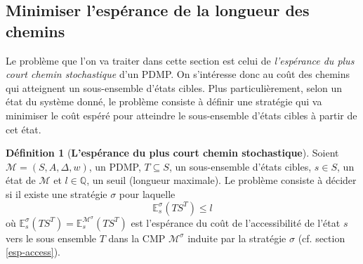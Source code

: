 \documentclass[12pt,a4paper]{report}
\theoremstyle{definition}%
\newtheorem{definition}{Définition}[chapter]
\theoremstyle{remark}
\begin{document}
\subsection{Minimiser l'espérance de la longueur des chemins}\label{sspe}
	Le problème que l'on va traiter dans cette section est celui de
	\textit{l'espérance du plus court chemin stochastique} d'un PDMP.
	On s'intéresse donc au coût des chemins qui atteignent un sous-ensemble
	d'états cibles.
	Plus particulièrement, selon un état du système donné, le problème consiste
	à définir une stratégie qui va minimiser le coût espéré pour atteindre le
	sous-ensemble d'états cibles à partir de cet état.

	\begin{definition}[\textbf{L'espérance du plus court chemin stochastique}]
		Soient $\mathcal{M} = (S, A, \Delta, w)$, un PDMP, $T \subseteq S$, un
		sous-ensemble d'états cibles, $s \in S$, un état de $\mathcal{M}$ et
		$l \in \mathbb{Q}$, un seuil (longueur maximale).
		Le problème consiste à décider si il existe une
		stratégie $\sigma$ pour laquelle
		\[\mathbb{E}^{\sigma}_s (TS^T)\leq l\] où
		$\mathbb{E}^\sigma_s(TS^T) = \mathbb{E}^{\mathcal{M}^\sigma}_s(TS^T)$ est
		l'espérance du coût de l'accessibilité de l'état $s$ vers le sous ensemble $T$
		dans la CMP $\mathcal{M}^\sigma$ induite par la stratégie
		$\sigma$ (cf. section \ref{esp-access}).
	\end{definition}
\end{document}
